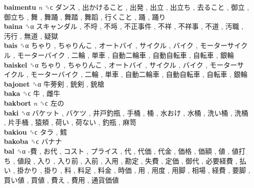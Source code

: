 \textbf{baimentu} \emph{n}  ␝ϲ   ダンス ,  出かけること ,  出発 ,  出立 ,  出立ち ,  去ること ,  御立 ,  御立ち ,  舞 ,  舞踊 ,  舞踏 ,  舞蹈 ,  行くこと ,  踊 ,  踊り   \\
\textbf{baina} ␝α   スキャンダル ,  不埒 ,  不埓 ,  不正事件 ,  不祥 ,  不祥事 ,  不道 ,  汚職 ,  汚行 ,  無道 ,  疑獄   \\
\textbf{bais} ␝α   ちゃり ,  ちゃりんこ ,  オートバイ ,  サイクル ,  バイク ,  モーターサイクル ,  モーターバイク ,  二輪 ,  単車 ,  自動二輪車 ,  自動自転車 ,  自転車 ,  銀輪   \\
\textbf{baiskel} ␝α   ちゃり ,  ちゃりんこ ,  オートバイ ,  サイクル ,  バイク ,  モーターサイクル ,  モーターバイク ,  二輪 ,  単車 ,  自動二輪車 ,  自動自転車 ,  自転車 ,  銀輪   \\
\textbf{bajonet} ␝α   牛蒡剣 ,  銃剣 ,  銃槍   \\
\textbf{baka} ␝ϲ   牛 ,  雌牛   \\
\textbf{bakbort} \emph{n}  ␝ϲ   左の   \\
\textbf{baki} ␝α   バケット ,  バケツ ,  井戸釣瓶 ,  手桶 ,  桶 ,  水おけ ,  水桶 ,  洗い桶 ,  洗桶 ,  片手桶 ,  猿頬 ,  荷い ,  荷ない ,  釣瓶 ,  麻笥   \\
\textbf{bakiou} ␝ϲ   タラ ,  鱈   \\
\textbf{bakoba} ␝ϲ   バナナ   \\
\textbf{bal} ␝α   -費 ,  お代 ,  コスト ,  プライス ,  代 ,  代価 ,  代金 ,  価格 ,  価額 ,  値 ,  値打ち ,  値段 ,  入り ,  入り前 ,  入前 ,  入用 ,  勘定 ,  失費 ,  定価 ,  御代 ,  必要経費 ,  払い ,  掛かり ,  掛り ,  料 ,  料足 ,  料金 ,  時価 ,  用 ,  用度 ,  用脚 ,  相場 ,  経費 ,  要脚 ,  買い値 ,  買値 ,  費え ,  費用 ,  通貨価値   \\
